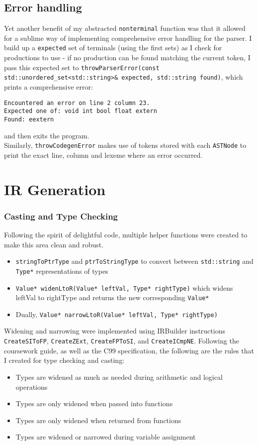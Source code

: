 \documentclass[10pt,a4paper]{article}
\newcommand{\code}[1]{\lstinline!#1!}
\begin{document}
\subsection*{Error handling}
Yet another benefit of my abstracted \code{nonterminal} function was that it allowed for a sublime way of implementing comprehensive error handling for the parser. I build up a \code{expected} set of terminals (using the first sets) as I check for productions to use - if no production can be found matching the current token, I pass this expected set to \code{throwParserError(const std::unordered_set<std::string>& expected, std::string found)}, which prints a comprehensive error:
\begin{lstlisting}[]
Encountered an error on line 2 column 23.
Expected one of: void int bool float extern 
Found: eextern
\end{lstlisting}
and then exits the program.\\
Similarly,
\code{throwCodegenError} makes use of tokens stored with each \code{ASTNode} to print the exact line, column and lexeme where an error occurred.
\section*{IR Generation}
\subsubsection*{Casting and Type Checking}
Following the spirit of delightful code, multiple helper functions were created to make this area clean and robust. 
\begin{itemize}
    \item \code{stringToPtrType} and \code{ptrToStringType} to convert between \code{std::string} and \code{Type*} representations of types
    \item \code{Value* widenLtoR(Value* leftVal, Type* rightType)} which widens leftVal to rightType and returns the new corresponding \code{Value*}
    \item Dually, \code{Value* narrowLtoR(Value* leftVal, Type* rightType)}
\end{itemize}
Widening and narrowing were implemented using IRBuilder instructions \code{CreateSIToFP}, \code{CreateZExt}, \code{CreateFPToSI}, and \code{CreateICmpNE}. Following the coursework guide, as well as the C99 specification, the following are the rules that I created for type checking and casting:
\begin{itemize}
    \item Types are widened as much as needed during arithmetic and logical operations
    \item Types are only widened when passed into functions
    \item Types are only widened when returned from functions
    \item Types are widened or narrowed during variable assignment
\end{itemize}
\end{document}
